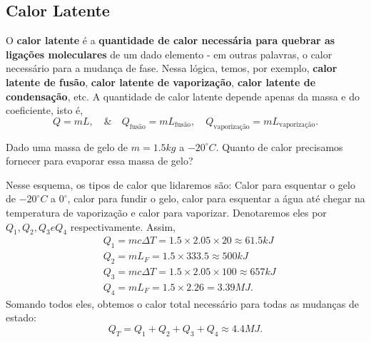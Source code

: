 \documentclass[PhysicsII/phsyicsII_notes.tex]{subfiles}
\begin{document}
\subsection{Calor Latente}
O \textbf{calor latente} é a \textbf{quantidade de calor necessária para quebrar as ligações moleculares} de um dado elemento - em outras palavras,
o calor necessário para a mudança de fase. Nessa lógica, temos, por exemplo, \textbf{calor latente de fusão}, \textbf{calor latente de vaporização},
\textbf{calor latente de condensação}, etc. A quantidade de calor latente depende apenas da massa e do coeficiente, isto é,
\[
	Q = mL,\quad\&\quad Q_{\text{fusão}} = mL_{\text{fusão}},\quad Q_{\text{vaporização}} = m L_{\text{vaporização}}.
\]
\begin{example}
	Dado uma massa de gelo de \(m = 1.5kg\) a \(-20^{\circ{}}C\). Quanto de calor precisamos fornecer para evaporar essa massa de gelo?

	Nesse esquema, os tipos de calor que lidaremos são: Calor para esquentar o gelo de \(-20^{\circ{}}C\) a \(0^{\circ{}}\), calor para fundir o gelo, calor para esquentar a água até chegar na temperatura
	de vaporização e calor para vaporizar. Denotaremos eles por \(Q_{1}, Q_{2}, Q_{3} e Q_{4}\)
	respectivamente. Assim,
	\begin{align*}
		 & Q_{1} = mc\Delta T = 1.5\times 2.05\times 20\approx 61.5kJ \\
		 & Q_{2} = mL_{F} = 1.5\times 333.5\approx 500kJ              \\
		 & Q_{3} = mc\Delta T = 1.5\times 2.05\times 100\approx 657kJ \\
		 & Q_{4} = mL_{F} = 1.5\times 2.26 = 3.39MJ.
	\end{align*}
	Somando todos eles, obtemos o calor total necessário para todas as mudanças de estado:
	\[
		Q_{T} = Q_{1} + Q_{2} + Q_{3} + Q_{4}\approx 4.4MJ.
	\]
\end{example}
\end{document}

